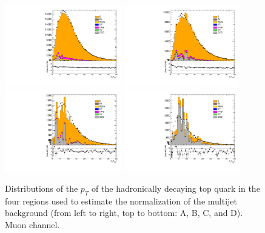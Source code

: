 \begin{figure}
  \centering
  \includegraphics[width=0.45\textwidth]{fig/chapt6/normalisation/dataMC_pt_thad_A_semimu.pdf}
  \includegraphics[width=0.45\textwidth]{fig/chapt6/normalisation/dataMC_pt_thad_C_semimu.pdf} \\
  \includegraphics[width=0.45\textwidth]{fig/chapt6/normalisation/dataMC_pt_thad_B_semimu.pdf}
  \includegraphics[width=0.45\textwidth]{fig/chapt6/normalisation/dataMC_pt_thad_D_semimu.pdf}
  \caption{Distributions of the $p_{T}$ of the hadronically decaying top quark in the four regions used to estimate the normalization of the multijet background (from left to right, top to bottom: A, B, C, and D). Muon channel.}
  \label{Fig:DataMC_ABCD_semimu}
\end{figure}

